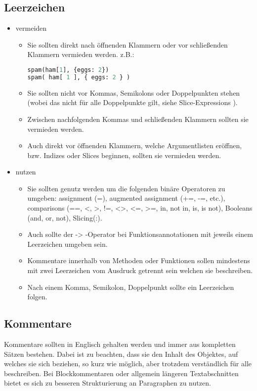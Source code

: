 \subsection{Leerzeichen}
\begin{itemize}
\item vermeiden
\begin{itemize}
\item Sie sollten direkt nach öffnenden Klammern oder vor schließenden Klammern vermieden werden.
z.B.: 
\begin{lstlisting}[language=python]
spam(ham[1], {eggs: 2})
spam( ham[ 1 ], { eggs: 2 } )
\end{lstlisting}
\item Sie sollten nicht vor Kommas, Semikolons oder Doppelpunkten stehen (wobei das nicht für alle Doppelpunkte gilt, siehe \grqq Slice-Expressions \grqq).
\item Zwischen \grqq nachfolgenden \grqq Kommas und schließenden Klammern sollten sie vermieden werden.
\item Auch direkt vor öffnenden Klammern, welche Argumentlisten eröffnen, bzw. Indizes oder Slices beginnen, sollten sie vermieden werden.
\end{itemize}
\item nutzen
\begin{itemize}
\item Sie sollten genutz werden um die folgenden binäre Operatoren zu umgeben: assignment (=), augmented assignment (+=, -=, etc.), comparisons (==, <, >, !=, <>, <=, >=, in, not in, is, is not), Booleans (and, or, not), Slicing(:).
\item Auch sollte der \grqq -> \grqq -Operator bei Funktionsannotationen mit jeweils einem Leerzeichen umgeben sein.
\item Kommentare innerhalb von Methoden oder Funktionen sollen mindestens mit zwei Leerzeichen vom Ausdruck getrennt sein welchen sie beschreiben.
\item Nach einem Komma, Semikolon, Doppelpunkt sollte ein Leerzeichen folgen.
\end{itemize}
\end{itemize}

\subsection{Kommentare}
Kommentare sollten in Englisch gehalten werden und immer aus kompletten Sätzen bestehen. Dabei ist zu beachten, dass sie den Inhalt des Objektes, auf welches sie sich beziehen, so kurz wie möglich, aber trotzdem verständlich für alle beschreiben. Bei Blockkommentaren oder allgemein längeren Textabschnitten bietet es sich zu besseren Strukturierung an Paragraphen zu nutzen.

